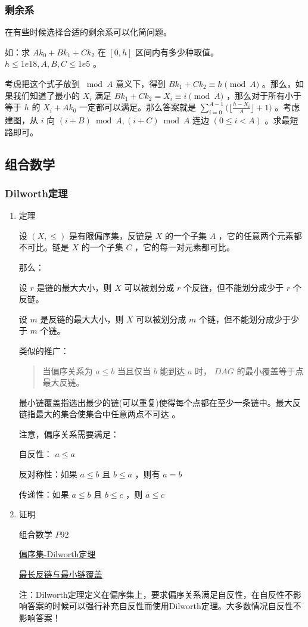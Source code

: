 \documentclass[11pt]{article}
\begin{document}
\subsubsection{剩余系}
\label{sec-3-3-4}

在有些时候选择合适的剩余系可以化简问题。

如：求 $Ak_0+Bk_1+Ck_2$ 在 $[0,h]$ 区间内有多少种取值。 $h \leq 1e18,A, B, C \leq 1e5$ 。

考虑把这个式子放到 $\bmod A$ 意义下，得到 $Bk_1+Ck_2 \equiv h \pmod A$ 。那么，如果我们知道了最小的 $X_i$ 满足 $Bk_1+Ck_2=X_i \equiv i \pmod A$ ，那么对于所有小于等于 $h$ 的 $X_i+Ak_0$ 一定都可以满足。那么答案就是 $\sum_{i=0}^{A-1} \Big(\Big\lfloor \frac{h-X_i}{A} \Big \rfloor+1\Big)$ 。考虑建图，从 $i$ 向 $(i+B) \bmod A,(i+C) \bmod A$ 连边 $(0\leq i < A)$ 。求最短路即可。

\subsection{组合数学}
\label{sec-3-4}
\subsubsection{Dilworth定理}
\label{sec-3-4-1}

\begin{enumerate}
\item 定理
\label{sec-3-4-1-1}

设 $(X,\leq)$ 是有限偏序集，反链是 $X$ 的一个子集 $A$ ，它的任意两个元素都不可比。链是 $X$ 的一个子集 $C$ ，它的每一对元素都可比。

那么：

设 $r$ 是链的最大大小，则 $X$ 可以被划分成 $r$ 个反链，但不能划分成少于 $r$ 个反链。

设 $m$ 是反链的最大大小，则 $X$ 可以被划分成 $m$ 个链，但不能划分成少于少于 $m$ 个链。

类似的推广：

\begin{quote}
当偏序关系为 $a \leq b$ 当且仅当 $b$ 能到达 $a$ 时， $DAG$ 的最小覆盖等于点最大反链。
\end{quote}

最小链覆盖指选出最少的链(可以重复)使得每个点都在至少一条链中。最大反链指最大的集合使集合中任意两点不可达 。


注意，偏序关系需要满足：

自反性： $a \leq a$ 

反对称性：如果 $a \leq b$ 且 $b \leq a$ ，则有 $a = b$ 

传递性：如果 $a \leq b$ 且 $b \leq c$ ，则 $a \leq c$ 

\item 证明
\label{sec-3-4-1-2}

组合数学 $P92$

\href{http://blog.csdn.net/xuzengqiang/article/details/7266034}{偏序集-Dilworth定理}

\href{http://vfleaking.blog.163.com/blog/static/1748076342012918105514527}{最长反链与最小链覆盖}

注：Dilworth定理定义在偏序集上，要求偏序关系满足自反性，在自反性不影响答案的时候可以强行补充自反性而使用Dilworth定理。大多数情况自反性不影响答案！
\end{enumerate}
\end{document}
